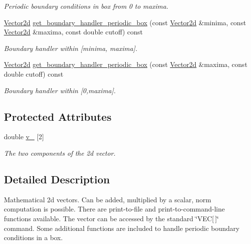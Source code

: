 \begin{DoxyCompactItemize}
\begin{DoxyCompactList}\small\item\em Periodic boundary conditions in box from 0 to maxima. \end{DoxyCompactList}\item 
\mbox{\hyperlink{classtopology_1_1Vector2d}{Vector2d}} \mbox{\hyperlink{classtopology_1_1Vector2d_a7917561de0e6efc767aa16280cd560c6}{get\+\_\+boundary\+\_\+handler\+\_\+periodic\+\_\+box}} (const \mbox{\hyperlink{classtopology_1_1Vector2d}{Vector2d}} \&minima, const \mbox{\hyperlink{classtopology_1_1Vector2d}{Vector2d}} \&maxima, const double cutoff) const
\begin{DoxyCompactList}\small\item\em Boundary handler within \mbox{[}minima, maxima\mbox{]}. \end{DoxyCompactList}\item 
\mbox{\label{classtopology_1_1Vector2d_aa1813245ed47e874d451cc8e5919f9e1}} 
\mbox{\hyperlink{classtopology_1_1Vector2d}{Vector2d}} \mbox{\hyperlink{classtopology_1_1Vector2d_aa1813245ed47e874d451cc8e5919f9e1}{get\+\_\+boundary\+\_\+handler\+\_\+periodic\+\_\+box}} (const \mbox{\hyperlink{classtopology_1_1Vector2d}{Vector2d}} \&maxima, const double cutoff) const
\begin{DoxyCompactList}\small\item\em Boundary handler within \mbox{[}0,maxima\mbox{]}. \end{DoxyCompactList}\end{DoxyCompactItemize}
\subsection*{Protected Attributes}
\begin{DoxyCompactItemize}
\item 
\mbox{\label{classtopology_1_1Vector2d_a980c304d315f712778a8730a5ef3f546}} 
double \mbox{\hyperlink{classtopology_1_1Vector2d_a980c304d315f712778a8730a5ef3f546}{v\+\_\+}} \mbox{[}2\mbox{]}
\begin{DoxyCompactList}\small\item\em The two components of the 2d vector. \end{DoxyCompactList}\end{DoxyCompactItemize}


\subsection{Detailed Description}
Mathematical 2d vectors. Can be added, multiplied by a scalar, norm computation is possible. There are print-\/to-\/file and print-\/to-\/command-\/line functions available. The vector can be accessed by the standard \char`\"{}\+V\+E\+C\mbox{[}$\,$\mbox{]}\char`\"{} command. Some additional functions are included to handle periodic boundary conditions in a box. 

